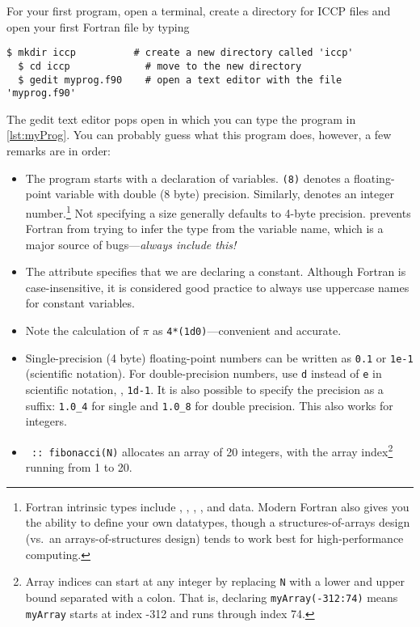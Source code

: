 For your first program, open a terminal, create a directory for ICCP files and open your first Fortran file by typing
\begin{lstlisting}[style=prompt, nolol]
  $ mkdir iccp          # create a new directory called 'iccp'
  $ cd iccp             # move to the new directory
  $ gedit myprog.f90    # open a text editor with the file 'myprog.f90'
\end{lstlisting}
The gedit text editor pops open in which you can type the program in \autoref{lst:myProg}.
You can probably guess what this program does, however, a few remarks are in order:
\begin{itemize}
  \item The program starts with a declaration of variables.
    \texttt{(8)} denotes a floating-point variable with double (8 byte) precision.
    Similarly,  denotes an integer number.\footnote{Fortran intrinsic types include , , , , and  data. Modern Fortran also gives you the ability to define your own datatypes, though a structures-of-arrays design (vs.\ an arrays-of-structures design) tends to work best for high-performance computing.}
    Not specifying a size generally defaults to 4-byte precision.
     prevents Fortran from trying to infer the type from the variable name, which is a major source of bugs---\emph{always include this!}
  \item The attribute  specifies that we are declaring a constant.
    Although Fortran is case-insensitive, it is considered good practice to always use uppercase names for constant variables.
  \item Note the calculation of $\pi$ as \texttt{4*(1d0)}---convenient and accurate.
  \item Single-precision (4 byte) floating-point numbers can be written as \texttt{0.1} or \texttt{1e-1} (scientific notation).
    For double-precision numbers, use \texttt{d} instead of \texttt{e} in scientific notation, \eg, \texttt{1d-1}.
    It is also possible to specify the precision as a suffix: \texttt{1.0\_4} for single and \texttt{1.0\_8} for double precision.
    This also works for integers.
  \item \texttt{ :: fibonacci(N)} allocates an array of 20
    integers, with the array index\footnote{Array indices can start at any integer by replacing \texttt{N} with a lower and upper bound separated with a colon. That is, declaring \texttt{myArray(-312:74)} means \texttt{myArray} starts at index -312 and runs through index 74.} running from 1 to 20.

\end{itemize}
